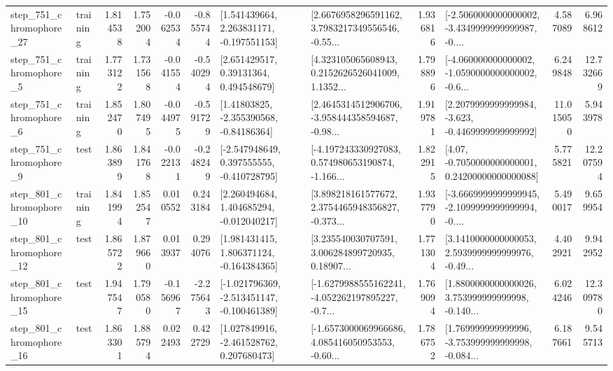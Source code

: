 \begin{tabular}{llrrrrllrlrr}
  step\_751\_chromophore\_27 &  training &      1.814538 &    1.752004 &     -0.062534 & -0.855744 &    [1.541439664, 2.263831171, -0.197551153] &  [2.6676958296591162, 3.7983217349556546, -0.55... &       1.936816 &  [-2.5060000000000002, -3.4349999999999987, -0.... &            4.587089 &          6.968612 \\
   step\_751\_chromophore\_5 &  training &      1.773122 &    1.731568 &     -0.041554 & -0.540294 &      [2.651429517, 0.39131364, 0.494548679] &  [4.323105065608943, 0.2152626526041009, 1.1352... &       1.798896 &  [-4.060000000000002, -1.0590000000000002, -0.6... &            6.249848 &         12.732669 \\
   step\_751\_chromophore\_6 &  training &      1.852470 &    1.807495 &     -0.044975 & -0.591729 &     [1.41803825, -2.355390568, -0.84186364] &  [2.4645314512906706, -3.958444358594687, -0.98... &       1.919781 &  [2.2079999999999984, -3.623, -0.4469999999999992] &           11.015050 &          5.943978 \\
   step\_751\_chromophore\_9 &      test &      1.863899 &    1.841768 &     -0.022131 & -0.248249 &   [-2.547948649, 0.397555555, -0.410728795] &  [-4.197243330927083, 0.574980653190874, -1.166... &       1.822915 &   [4.07, -0.7050000000000001, 0.24200000000000088] &            5.775821 &         12.207594 \\
  step\_801\_chromophore\_10 &  training &      1.841994 &    1.852547 &      0.010552 &  0.243184 &    [2.260494684, 1.404685294, -0.012040217] &  [3.898218161577672, 2.3754465948356827, -0.373... &       1.937790 &  [-3.6669999999999945, -2.1099999999999994, -0.... &            5.490017 &          9.659954 \\
  step\_801\_chromophore\_12 &      test &      1.865722 &    1.879660 &      0.013937 &  0.294076 &    [1.981431415, 1.806371124, -0.164384365] &  [3.235540030707591, 3.006284899720935, 0.18907... &       1.771304 &  [3.1410000000000053, 2.5939999999999976, -0.49... &            4.402921 &          9.942952 \\
  step\_801\_chromophore\_15 &      test &      1.947547 &    1.790580 &     -0.156967 & -2.275643 &  [-1.021796369, -2.513451147, -0.100461389] &  [-1.6279988555162241, -4.052262197895227, -0.7... &       1.769094 &  [1.8800000000000026, 3.753999999999998, -0.140... &            6.024246 &         12.309780 \\
  step\_801\_chromophore\_16 &      test &      1.863301 &    1.885794 &      0.022493 &  0.422729 &    [1.027849916, -2.461528762, 0.207680473] &  [-1.6573000069966686, 4.085416050953553, -0.60... &       1.786752 &  [1.769999999999996, -3.753999999999998, -0.084... &            6.187661 &          9.545713 \\

\end{tabular}
